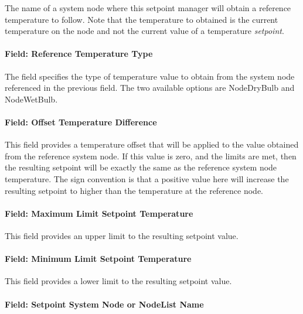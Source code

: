 The name of a system node where this setpoint manager will obtain a reference temperature to follow. Note that the temperature to obtained is the current temperature on the node and not the current value of a temperature \emph{setpoint}.

\paragraph{Field: Reference Temperature Type}\label{field-reference-temperature-type-1}

The field specifies the type of temperature value to obtain from the system node referenced in the previous field. The two available options are NodeDryBulb and NodeWetBulb.

\paragraph{Field: Offset Temperature Difference}\label{field-offset-temperature-difference-1}

This field provides a temperature offset that will be applied to the value obtained from the reference system node. If this value is zero, and the limits are met, then the resulting setpoint will be exactly the same as the reference system node temperature. The sign convention is that a positive value here will increase the resulting setpoint to higher than the temperature at the reference node.

\paragraph{Field: Maximum Limit Setpoint Temperature}\label{field-maximum-limit-setpoint-temperature}

This field provides an upper limit to the resulting setpoint value.

\paragraph{Field: Minimum Limit Setpoint Temperature}\label{field-minimum-limit-setpoint-temperature}

This field provides a lower limit to the resulting setpoint value.

\paragraph{Field: Setpoint System Node or NodeList Name}\label{field-setpoint-system-node-or-nodelist-name}

